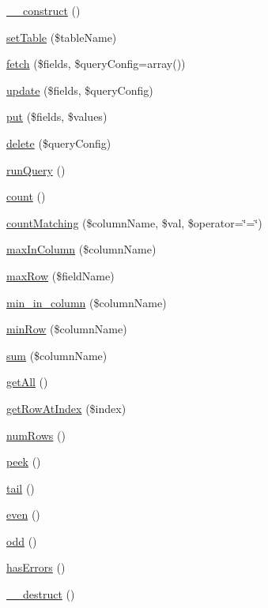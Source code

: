 \begin{DoxyCompactItemize}
\item 
\hyperlink{class_linda_a095c5d389db211932136b53f25f39685}{\+\_\+\+\_\+construct} ()
\item 
\hyperlink{class_linda_aaded27ecadbc8530b9b21cbb38dfa4a8}{set\+Table} (\$table\+Name)
\item 
\hyperlink{class_linda_a87d58413379d402e5dee4f5825b686fd}{fetch} (\$fields, \$query\+Config=array())
\item 
\hyperlink{class_linda_ac000dfba7a410bb147dc77571d1e2ed5}{update} (\$fields, \$query\+Config)
\item 
\hyperlink{class_linda_af5a8f159a27ca700aa869092a5696be1}{put} (\$fields, \$values)
\item 
\hyperlink{class_linda_a8a141e762ceb79165d9a049eaa718d38}{delete} (\$query\+Config)
\item 
\hyperlink{class_linda_ad2e4fa0b57c9acdf15cd932346381af5}{run\+Query} ()
\item 
\hyperlink{class_linda_ac751e87b3d4c4bf2feb03bee8b092755}{count} ()
\item 
\hyperlink{class_linda_ad119b26c518197ce516ac2f4bf7a07ab}{count\+Matching} (\$column\+Name, \$val, \$operator=\char`\"{}=\char`\"{})
\item 
\hyperlink{class_linda_a34d160ad28ce16c5906d2d911fbda77d}{max\+In\+Column} (\$column\+Name)
\item 
\hyperlink{class_linda_ace93ec905a1eba8f431c1d6bb279ac20}{max\+Row} (\$field\+Name)
\item 
\hyperlink{class_linda_a47a8d3c75c7454aca40d3b7808465ab6}{min\+\_\+in\+\_\+column} (\$column\+Name)
\item 
\hyperlink{class_linda_a94e9b7b94a61bc48ad5d866bc93670ce}{min\+Row} (\$column\+Name)
\item 
\hyperlink{class_linda_ab3cd1f43979f64ef99b52795f616df32}{sum} (\$column\+Name)
\item 
\hyperlink{class_linda_aba0d5b303383fb5b1fabb5fd01cd3800}{get\+All} ()
\item 
\hyperlink{class_linda_a15fff7e5f77cd6a7e7656e3e46b20a5c}{get\+Row\+At\+Index} (\$index)
\item 
\hyperlink{class_linda_af37433a300db1f607ee789d22828a0a0}{num\+Rows} ()
\item 
\hyperlink{class_linda_af0d2b98b49496eaef856a5b277fa775b}{peek} ()
\item 
\hyperlink{class_linda_a45fd7828ad0376368f5c32b64d5dbac4}{tail} ()
\item 
\hyperlink{class_linda_a046b5f5e8b171d4724f2780303239825}{even} ()
\item 
\hyperlink{class_linda_a666c4ea82d473f0e68ad97e3f33d1e83}{odd} ()
\item 
\hyperlink{class_linda_aada71735dcc56f4cae3b82c55e090e8d}{has\+Errors} ()
\item 
\hyperlink{class_linda_a421831a265621325e1fdd19aace0c758}{\+\_\+\+\_\+destruct} ()
\end{DoxyCompactItemize}
